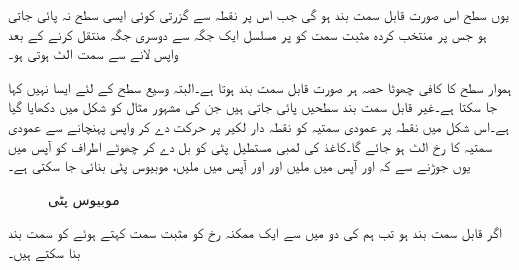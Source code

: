 یوں سطح  اس صورت قابل سمت بند ہو گی جب اس پر نقطہ  سے گزرتی کوئی ایسی سطح  نہ پائی جاتی ہو جس پر منتخب کردہ مثبت سمت کو  پر مسلسل ایک جگہ سے دوسری جگہ منتقل کرنے کے بعد واپس  لانے سے سمت الٹ ہوتی ہو۔    

ہموار سطح کا کافی چھوٹا حصہ ہر صورت قابل سمت بند ہوتا ہے۔البتہ وسیع سطح کے لئے ایسا نہیں کہا جا سکتا ہے۔غیر قابل سمت بند سطحیں پائی جاتی ہیں جن کی مشہور مثال  کو شکل  میں دکھایا گیا ہے۔اس شکل میں نقطہ  پر عمودی سمتیہ کو نقطہ دار لکیر پر  حرکت دے کر  واپس  پہنچانے سے  عمودی سمتیہ کا رخ الٹ ہو جائے گا۔کاغذ کی لمبی مستطیل پٹی کو بل دے کر چھوٹے اطراف کو آپس میں یوں جوڑنے سے کہ  اور  آپس میں ملیں اور  اور  آپس میں ملیں، موبیوس پٹی بنائی جا سکتی ہے۔
\begin{figure}
\centering
\begin{subfigure}{0.5\textwidth}
\centering
{}%
\end{subfigure}%
\begin{subfigure}{0.5\textwidth}
\centering
{}
\end{subfigure}%
\caption{موبیوس پٹی}
\label{شکل_خطی_تکمل_موبیوس_پٹی}
\end{figure}
اگر  قابل سمت بند ہو تب ہم  کی دو میں سے ایک ممکنہ رخ کو مثبت سمت کہتے ہوئے  کو سمت بند بنا سکتے ہیں۔

